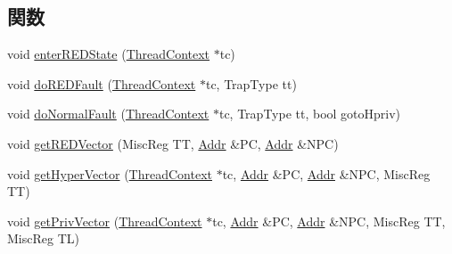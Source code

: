 \subsection*{関数}
\begin{DoxyCompactItemize}
\item 
void \hyperlink{namespaceSparcISA_af886d65b7669284f33784702caa9bddc}{enterREDState} (\hyperlink{classThreadContext}{ThreadContext} $\ast$tc)
\item 
void \hyperlink{namespaceSparcISA_a0a06026b205d00709c2f34b018fc1dfd}{doREDFault} (\hyperlink{classThreadContext}{ThreadContext} $\ast$tc, TrapType tt)
\item 
void \hyperlink{namespaceSparcISA_ac81fd7b66ea3afdf9597646f8732c2ff}{doNormalFault} (\hyperlink{classThreadContext}{ThreadContext} $\ast$tc, TrapType tt, bool gotoHpriv)
\item 
void \hyperlink{namespaceSparcISA_a49dee5cc438e190bcdb1756438219536}{getREDVector} (MiscReg TT, \hyperlink{base_2types_8hh_af1bb03d6a4ee096394a6749f0a169232}{Addr} \&PC, \hyperlink{base_2types_8hh_af1bb03d6a4ee096394a6749f0a169232}{Addr} \&NPC)
\item 
void \hyperlink{namespaceSparcISA_a56dcbc48848c13640127fdef50b12bf7}{getHyperVector} (\hyperlink{classThreadContext}{ThreadContext} $\ast$tc, \hyperlink{base_2types_8hh_af1bb03d6a4ee096394a6749f0a169232}{Addr} \&PC, \hyperlink{base_2types_8hh_af1bb03d6a4ee096394a6749f0a169232}{Addr} \&NPC, MiscReg TT)
\item 
void \hyperlink{namespaceSparcISA_a2fa7898cfa4407a5ae9e3ae734d6378b}{getPrivVector} (\hyperlink{classThreadContext}{ThreadContext} $\ast$tc, \hyperlink{base_2types_8hh_af1bb03d6a4ee096394a6749f0a169232}{Addr} \&PC, \hyperlink{base_2types_8hh_af1bb03d6a4ee096394a6749f0a169232}{Addr} \&NPC, MiscReg TT, MiscReg TL)
\end{DoxyCompactItemize}
